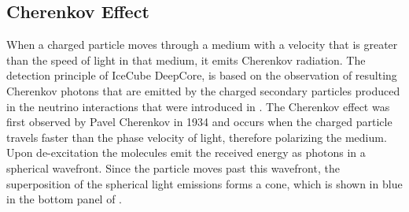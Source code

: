 \subsection{Cherenkov Effect} 

When a charged particle moves through a medium with a velocity that is greater than the speed of light in that medium, it emits Cherenkov radiation.
The detection principle of IceCube DeepCore, is based on the observation of resulting Cherenkov photons that are emitted by the charged secondary particles produced in the neutrino interactions that were introduced in . The Cherenkov effect was first observed by Pavel Cherenkov in 1934  and occurs when the charged particle travels faster than the phase velocity of light, therefore polarizing the medium. Upon de-excitation the molecules emit the received energy as photons in a spherical wavefront. Since the particle moves past this wavefront, the superposition of the spherical light emissions forms a cone, which is shown in blue in the bottom panel of .


